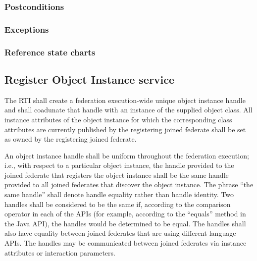 \begin{compactstdpage}

    \subsubsection{Postconditions}



    \subsubsection{Exceptions}



    \subsubsection{Reference state charts}



    \subsection{Register Object Instance service}


    The RTI shall create a federation execution-wide unique object instance handle and shall coadunate that handle with an instance of the supplied object class. All instance attributes of the object instance for which the corresponding class attributes are currently published by the registering joined federate shall be set as owned by the registering joined federate.


    An object instance handle shall be uniform throughout the federation execution; i.e., with respect to a particular object instance, the handle provided to the joined federate that registers the object instance shall be the same handle provided to all joined federates that discover the object instance. The phrase ``the same handle'' shall denote handle equality rather than handle identity. Two handles shall be considered to be the same if, according to the comparison operator in each of the APIs (for example, according to the ``equals'' method in the Java API), the handles would be determined to be equal. The handles shall also have equality between joined federates that are using different language APIs. The handles may be communicated between joined federates via instance attributes or interaction parameters.



\end{compactstdpage}
